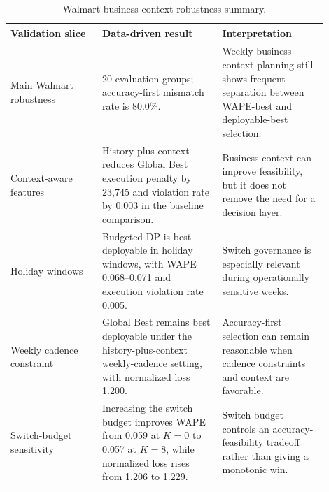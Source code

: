 \begin{table}[htbp]
\centering
\caption{Walmart business-context robustness summary.}
\label{tab:walmart-robustness}
\scriptsize
\begin{tabular}{@{}p{0.26\linewidth}p{0.34\linewidth}p{0.30\linewidth}@{}}
\toprule
\textbf{Validation slice} & \textbf{Data-driven result} & \textbf{Interpretation} \\
\midrule
Main Walmart robustness & 20 evaluation groups; accuracy-first mismatch rate is 80.0\%. & Weekly business-context planning still shows frequent separation between WAPE-best and deployable-best selection. \\
Context-aware features & History-plus-context reduces Global Best execution penalty by 23,745 and violation rate by 0.003 in the baseline comparison. & Business context can improve feasibility, but it does not remove the need for a decision layer. \\
Holiday windows & Budgeted DP is best deployable in holiday windows, with WAPE 0.068--0.071 and execution violation rate 0.005. & Switch governance is especially relevant during operationally sensitive weeks. \\
Weekly cadence constraint & Global Best remains best deployable under the history-plus-context weekly-cadence setting, with normalized loss 1.200. & Accuracy-first selection can remain reasonable when cadence constraints and context are favorable. \\
Switch-budget sensitivity & Increasing the switch budget improves WAPE from 0.059 at $K=0$ to 0.057 at $K=8$, while normalized loss rises from 1.206 to 1.229. & Switch budget controls an accuracy-feasibility tradeoff rather than giving a monotonic win. \\
\bottomrule
\end{tabular}
\end{table}
